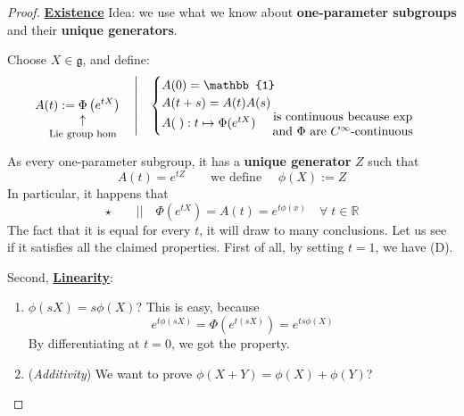 \documentclass[../main.tex]{subfiles}
\begin{document}
\begin{proof}
\underline{\textbf{Existence}}  Idea: we use what we know about \textbf{one-parameter subgroups} and their \textbf{unique generators}.

Choose $X\in\mathfrak{g}$, and define:
\[
A(t):=\underset{\mathclap{\tikz \node {$\uparrow$} node [below=1ex] {\footnotesize  Lie group hom};}}{\Phi}\left(e^{tX}\right) \quad \left| \quad \begin{cases}
A(0)=\mathbb{1}\\
A(t+s)=A(t)A(s)\\
A(\;):t\mapsto\Phi(e^{tX})\quad\ \text{\parbox{4 cm}{\centering is continuous because exp and $\Phi$ are $C^\infty$-continuous}}
\end{cases}
\right.
\]
As every one-parameter subgroup, it has a \textbf{unique generator} $Z$ such that
\[
A(t)=e^{tZ} \qquad \textrm{we define }\quad\phi(X):=Z
\]
In particular, it happens that
\[
\star\qquad\Big|\Big|\quad\Phi\left(e^{tX}\right)=A(t)=e^{t\phi(x)} \quad \forall\;t\in\mathbb{R}
\]
The fact that it is equal for every $t$, it will draw to many conclusions. Let us see if it satisfies all the claimed properties. First of all, by setting $t=1$, we have (D).

Second, \underline{\textbf{Linearity}}:
\renewcommand{\labelenumi}{\Roman{enumi})}
\begin{enumerate}
    \item $\phi(sX)=s\phi(X)$? This is easy, because
    \[
    e^{t\phi(sX)}=\Phi(e^{t(sX)})=e^{ts\phi(X)}
    \]
    By differentiating at $t=0$, we got the property.
    \item (\textit{Additivity}) We want to prove $\phi(X+Y)=\phi(X)+\phi(Y)$?
    

\end{enumerate}
\end{proof}
\end{document}
